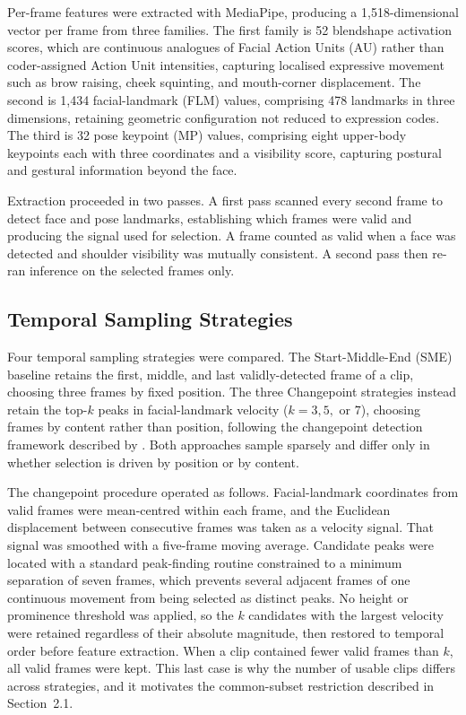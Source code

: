 \documentclass[11pt,a4paper]{article}
\begin{document}
Per-frame features were extracted with MediaPipe, producing a 1,518-dimensional vector per frame from three families. The first family is 52 blendshape activation scores, which are continuous analogues of Facial Action Units (AU) \citep{ekman1978} rather than coder-assigned Action Unit intensities, capturing localised expressive movement such as brow raising, cheek squinting, and mouth-corner displacement. The second is 1,434 facial-landmark (FLM) values, comprising 478 landmarks in three dimensions, retaining geometric configuration not reduced to expression codes. The third is 32 pose keypoint (MP) values, comprising eight upper-body keypoints each with three coordinates and a visibility score, capturing postural and gestural information beyond the face.

Extraction proceeded in two passes. A first pass scanned every second frame to detect face and pose landmarks, establishing which frames were valid and producing the signal used for selection. A frame counted as valid when a face was detected and shoulder visibility was mutually consistent. A second pass then re-ran inference on the selected frames only.

\subsection{Temporal Sampling Strategies}

Four temporal sampling strategies were compared. The Start-Middle-End (SME) baseline retains the first, middle, and last validly-detected frame of a clip, choosing three frames by fixed position. The three Changepoint strategies instead retain the top-$k$ peaks in facial-landmark velocity ($k = 3, 5,$ or $7$), choosing frames by content rather than position, following the changepoint detection framework described by \citet{truong2020}. Both approaches sample sparsely and differ only in whether selection is driven by position or by content.

The changepoint procedure operated as follows. Facial-landmark coordinates from valid frames were mean-centred within each frame, and the Euclidean displacement between consecutive frames was taken as a velocity signal. That signal was smoothed with a five-frame moving average. Candidate peaks were located with a standard peak-finding routine constrained to a minimum separation of seven frames, which prevents several adjacent frames of one continuous movement from being selected as distinct peaks. No height or prominence threshold was applied, so the $k$ candidates with the largest velocity were retained regardless of their absolute magnitude, then restored to temporal order before feature extraction. When a clip contained fewer valid frames than $k$, all valid frames were kept. This last case is why the number of usable clips differs across strategies, and it motivates the common-subset restriction described in Section~2.1.
\end{document}

